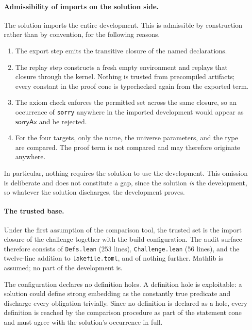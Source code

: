 \documentclass{article}
\begin{document}
\paragraph{Admissibility of imports on the solution side.}
The solution imports the entire development. This is admissible by construction
rather than by convention, for the following reasons.
\begin{enumerate}
  \item The export step emits the transitive closure of the named declarations.
  \item The replay step constructs a fresh empty environment and replays that
  closure through the kernel. Nothing is trusted from precompiled artifacts;
  every constant in the proof cone is typechecked again from the exported term.
  \item The axiom check enforces the permitted set across the same closure, so
  an occurrence of \verb|sorry| anywhere in the imported development would
  appear as \(\mathsf{sorryAx}\) and be rejected.
  \item For the four targets, only the name, the universe parameters, and the
  type are compared. The proof term is not compared and may therefore originate
  anywhere.
\end{enumerate}
In particular, nothing requires the solution to use the development. This
omission is deliberate and does not constitute a gap, since the solution
\emph{is} the development, so whatever the solution discharges, the development
proves.

\paragraph{The trusted base.}
Under the first assumption of the comparison tool, the trusted set is the import
closure of the challenge together with the build configuration. The audit
surface therefore consists of \verb|Defs.lean| (253 lines),
\verb|Challenge.lean| (56 lines), and the twelve-line addition to
\verb|lakefile.toml|, and of nothing further. Mathlib is assumed; no part of the
development is.

The configuration declares no definition holes. A definition hole is
exploitable: a solution could define strong embedding as the constantly true
predicate and discharge every obligation trivially. Since no definition is
declared as a hole, every definition is reached by the comparison procedure as
part of the statement cone and must agree with the solution's occurrence in full.
\end{document}
